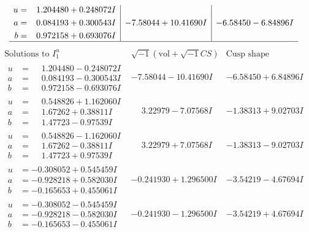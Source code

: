 \documentclass[1p]{elsarticle_modified}
\theoremstyle{definition}
\newcommand{\I}{\sqrt{-1}}
\begin{document}
$$\begin{array}{c|c|c}
\begin{aligned}
u &= \phantom{-}1.204480 + 0.248072 I \\
a &= \phantom{-}0.084193 + 0.300543 I \\
b &= \phantom{-}0.972158 + 0.693076 I\end{aligned}
 & -7.58044 + 10.41690 I & -6.58450 - 6.84896 I\\
 \hline 
 \end{array}$$\newpage$$\begin{array}{c|c|c}  
\text{Solutions to }I^u_{1}& \I (\text{vol} + \sqrt{-1}CS) & \text{Cusp shape}\\
 \hline 
\begin{aligned}
u &= \phantom{-}1.204480 - 0.248072 I \\
a &= \phantom{-}0.084193 - 0.300543 I \\
b &= \phantom{-}0.972158 - 0.693076 I\end{aligned}
 & -7.58044 - 10.41690 I & -6.58450 + 6.84896 I \\ \hline\begin{aligned}
u &= \phantom{-}0.548826 + 1.162060 I \\
a &= \phantom{-}1.67262 + 0.38811 I \\
b &= \phantom{-}1.47723 - 0.97539 I\end{aligned}
 & \phantom{-}3.22979 - 7.07568 I & -1.38313 + 9.02703 I \\ \hline\begin{aligned}
u &= \phantom{-}0.548826 - 1.162060 I \\
a &= \phantom{-}1.67262 - 0.38811 I \\
b &= \phantom{-}1.47723 + 0.97539 I\end{aligned}
 & \phantom{-}3.22979 + 7.07568 I & -1.38313 - 9.02703 I \\ \hline\begin{aligned}
u &= -0.308052 + 0.545459 I \\
a &= -0.928218 + 0.582030 I \\
b &= -0.165653 + 0.455061 I\end{aligned}
 & -0.241930 + 1.296500 I & -3.54219 - 4.67694 I \\ \hline\begin{aligned}
u &= -0.308052 - 0.545459 I \\
a &= -0.928218 - 0.582030 I \\
b &= -0.165653 - 0.455061 I\end{aligned}
 & -0.241930 - 1.296500 I & -3.54219 + 4.67694 I \\ \hline\begin{aligned}

\end{aligned}
\end{array}$$
\end{document}
